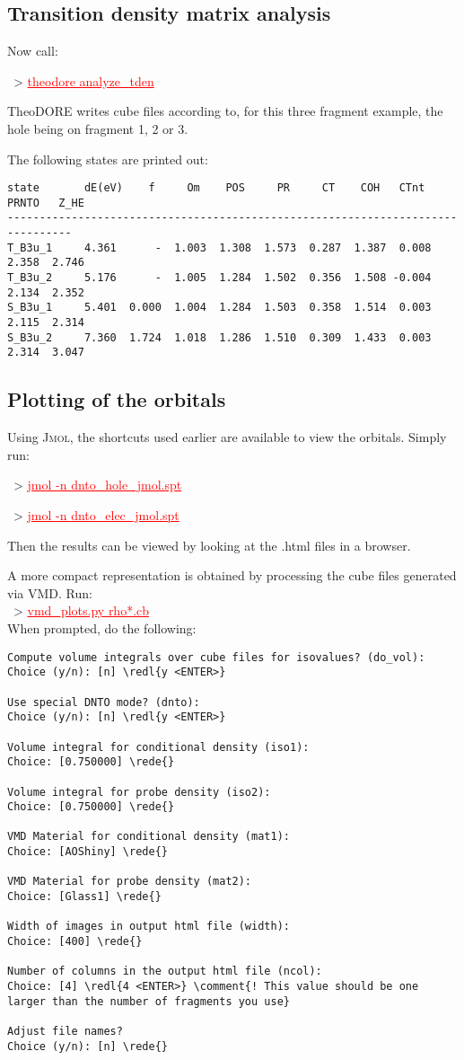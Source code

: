 \documentclass[DIV=12,headings=normal]{scrartcl}
\newcommand{\comment}[1]{\textcolor{blue}{#1}}
\newcommand{\redl}[1]{{\textcolor{red}{\underline{#1}}}}
\newcommand{\rede}[1]{\redl{#1 <ENTER>}}
\newcommand{\comm}[1]{
\small
~> \redl{#1}
\normalsize
}
\newcounter{number}
\begin{document}
\subsection{Transition density matrix analysis}
Now call:
\comm{theodore analyze\_tden}

TheoDORE writes cube files according to, for this three fragment example, the hole being on fragment 1, 2 or 3.

The following states are printed out:

\scriptsize
\begin{Verbatim}[commandchars=\\\{\}]
state       dE(eV)    f     Om    POS     PR     CT    COH   CTnt  PRNTO   Z_HE
--------------------------------------------------------------------------------
T_B3u_1     4.361      -  1.003  1.308  1.573  0.287  1.387  0.008  2.358  2.746
T_B3u_2     5.176      -  1.005  1.284  1.502  0.356  1.508 -0.004  2.134  2.352
S_B3u_1     5.401  0.000  1.004  1.284  1.503  0.358  1.514  0.003  2.115  2.314
S_B3u_2     7.360  1.724  1.018  1.286  1.510  0.309  1.433  0.003  2.314  3.047
\end{Verbatim}
\normalsize

\subsection{Plotting of the orbitals}
Using \textsc{Jmol}, the shortcuts used earlier are available to view the orbitals. Simply run:

\comm{jmol -n dnto\_hole\_jmol.spt}
\comm{jmol -n dnto\_elec\_jmol.spt}

Then the results can be viewed by looking at the .html files in a browser.

A more compact representation is obtained by processing the cube files generated via VMD. Run:\\
\comm{vmd\_plots.py rho*.cb}\\
When prompted, do the following:
\scriptsize
\begin{Verbatim}[commandchars=\\\{\}]
Compute volume integrals over cube files for isovalues? (do_vol):
Choice (y/n): [n] \redl{y <ENTER>}

Use special DNTO mode? (dnto):
Choice (y/n): [n] \redl{y <ENTER>}

Volume integral for conditional density (iso1):
Choice: [0.750000] \rede{}

Volume integral for probe density (iso2):
Choice: [0.750000] \rede{}

VMD Material for conditional density (mat1):
Choice: [AOShiny] \rede{}

VMD Material for probe density (mat2):
Choice: [Glass1] \rede{}

Width of images in output html file (width):
Choice: [400] \rede{}

Number of columns in the output html file (ncol):
Choice: [4] \redl{4 <ENTER>} \comment{! This value should be one larger than the number of fragments you use}

Adjust file names?
Choice (y/n): [n] \rede{}
\end{Verbatim}
\normalsize
\end{document}
